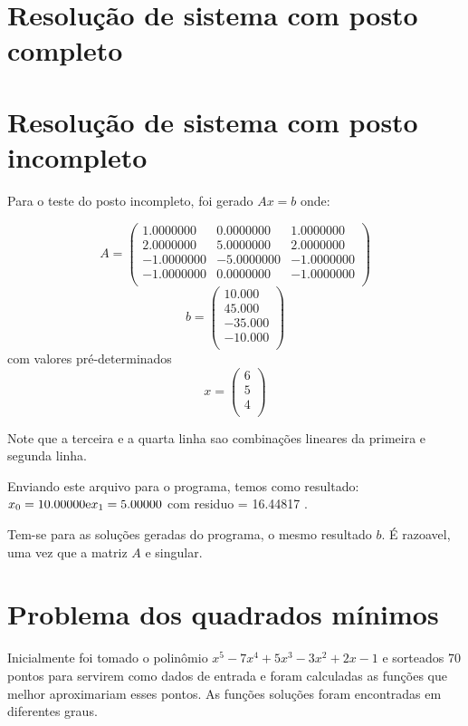 \chapter{Resolução de sistema com posto completo}


\chapter{Resolução de sistema com posto incompleto}
Para o teste do posto incompleto, foi gerado $Ax = b$ onde:


\[
A =
\left(
\begin{array}{ccc}
	1.0000000 & 0.0000000 & 1.0000000\\
	2.0000000 & 5.0000000 & 2.0000000\\
	-1.0000000 & -5.0000000 & -1.0000000\\
	-1.0000000 & 0.0000000 & -1.0000000\\
\end{array}
\right)
\]
\[
b =
\left(
\begin{array}{c}
10.000  \\
45.000  \\
-35.000  \\
-10.000  \\
\end{array}\right)    
\]
com valores pré-determinados\[ x = 
\left(
\begin{array}{c}
6\\
5\\
4\\
\end{array}
\right)\]

Note que a terceira e a quarta linha sao combinações lineares da primeira e segunda linha.

Enviando este arquivo para o programa, temos como resultado:
\(x_0 = 10.00000 $e$ x_1 = 5.00000 \) com residuo = 16.44817 .

Tem-se para as soluções geradas do programa, o mesmo resultado $b$. É razoavel, 
uma vez que a matriz $A$ e singular. 


\chapter{Problema dos quadrados mínimos}
Inicialmente foi tomado o polinômio $x^5-7x^4+5x^3-3x^2+2x-1$ e sorteados
70 pontos para servirem como  dados de entrada e foram calculadas as funções que
melhor aproximariam esses pontos.
As funções soluções foram encontradas em diferentes graus. 

